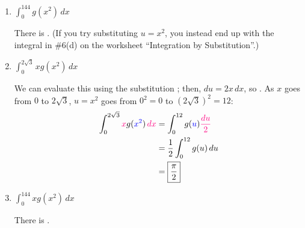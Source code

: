 \documentclass[main]{subfiles}
\begin{document}
\begin{enumerate}
\begin{enumerate}
    \item
      \begin{problem}[\stretch{0.3}]
        $\displaystyle \int_0^{144} g(x^2)\,dx$
      \end{problem}

      \begin{solution}
        There is .  (If you try substituting
        $u = x^2$, you instead end up with the integral in
        {{{{{{\#6}}(d)}} on {the worksheet ``Integration by Substitution''}}}.)
      \end{solution}

    \item
      \begin{problem}[\stretch{0.3}]
        $\displaystyle \int_0^{2 \sqrt{3}} x g(x^2)\,dx$
      \end{problem}

      \begin{solution}
        We can evaluate this using the substitution ; then,
        $du = 2x\,dx$, so .  As $x$ goes from
        $0$ to $2 \sqrt{3}$, $u = x^2$ goes from $0^2 = 0$ to $\left(2
          \sqrt{3} \right)^2 = 12$:
        \begin{align*}
          \int_0^{2 \sqrt{3}} \subd{x} g(\sub{x^2})\,\subd{dx} &=
          \int_0^{12} g(\sub{u}) \subd{\frac{du}{2}} \\
          &= \frac{1}{2} \int_0^{12}
          g(u)\,du \\
          &= \boxed{\frac{\pi}{2}}
        \end{align*}
      \end{solution}

    \item
      \begin{problem}[\stretch{0.3}]
        $\displaystyle \int_0^{144} x g(x^2)\,dx$
      \end{problem}

      \begin{solution}
        There is .
      \end{solution}

    \end{enumerate}
    \probonly{}

\end{enumerate}
\end{document}
